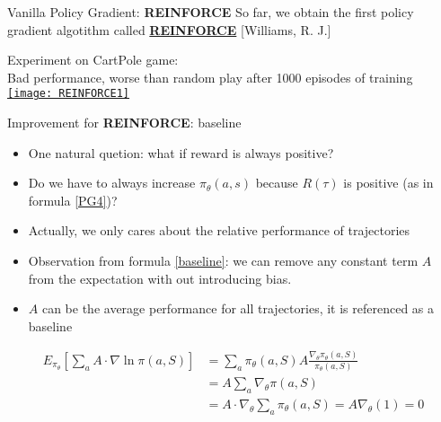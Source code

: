 \begin{frame}{Vanilla Policy Gradient: \textbf{REINFORCE}}
    \vspace{0.2cm}
    So far, we obtain the first policy gradient algotithm called \href{http://www-anw.cs.umass.edu/~barto/courses/cs687/williams92simple.pdf}{\textbf{REINFORCE}} \textcolor{CUHKgreen}{\footnotesize[Williams, R. J.]}
    \begin{center}Experiment on CartPole game:\\Bad performance, worse than random play after 1000 episodes of training\\\href{https://www.youtube.com/watch?v=1bvTOM7Az3s}{\texttt{[image: REINFORCE1]}}\end{center}
\end{frame}


\begin{frame}{Improvement for \textbf{REINFORCE}: baseline}
    \begin{itemize}
        \item One natural quetion: what if reward is always positive? \\
        \item Do we have to always increase $\pi_{\theta}(a,s)$ because $R(\tau)$ is positive (as in formula \ref{PG4})?\\
        \item Actually, we only cares about the relative performance of trajectories\\
        \item Observation from formula \ref{baseline}: we can remove any constant term $A$ from the expectation with out introducing bias.
        \item $A$ can be the average performance for all trajectories, it is referenced as a baseline
    \end{itemize}
    \begin{equation}
        \label{baseline}
        \begin{split}
            E_{\pi_\theta}[\sum\limits_{a}A\cdot\nabla\ln\pi(a,S)] &= \sum\limits_{a}\pi_\theta(a,S)A\frac{\nabla_\theta\pi_\theta(a,S)}{\pi_\theta(a,S)}\\
                                                                   &= A \sum\limits_{a}\nabla_\theta\pi(a,S)\\
                                                                   &= A\cdot\nabla_\theta\sum\limits_{a}\pi_\theta(a,S)= A \nabla_\theta(1)= 0
        \end{split}
    \end{equation}
    
\end{frame}

